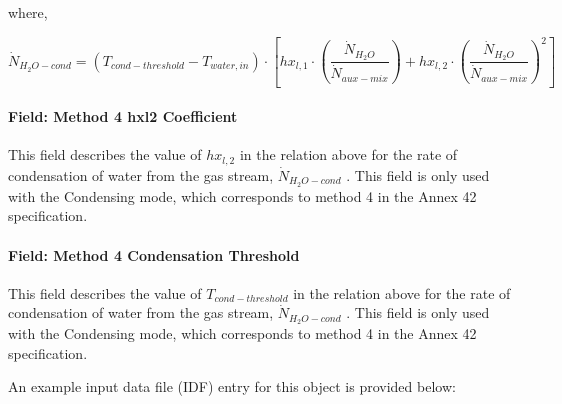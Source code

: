 where,

\begin{equation}
{\dot N_{{H_2}O - cond}} = \left( {{T_{cond - threshold}} - {T_{water,in}}} \right) \cdot \left[ {h{x_{l,1}} \cdot \left( {\frac{{{{\dot N}_{{H_2}O}}}}{{{{\dot N}_{aux - mix}}}}} \right) + h{x_{l,2}} \cdot {{\left( {\frac{{{{\dot N}_{{H_2}O}}}}{{{{\dot N}_{aux - mix}}}}} \right)}^2}} \right]
\end{equation}

\paragraph{Field: Method 4 hxl2 Coefficient}\label{field-method-4-hxl2-coefficient}

This field describes the value of \(h{x_{l,2}}\) in the relation above for the rate of condensation of water from the gas stream, \({\dot N_{{H_2}O - cond}}\) . This field is only used with the Condensing mode, which corresponds to method 4 in the Annex 42 specification.

\paragraph{Field: Method 4 Condensation Threshold}\label{field-method-4-condensation-threshold}

This field describes the value of \({T_{cond - threshold}}\) in the relation above for the rate of condensation of water from the gas stream, \({\dot N_{{H_2}O - cond}}\) . This field is only used with the Condensing mode, which corresponds to method 4 in the Annex 42 specification.

An example input data file (IDF) entry for this object is provided below:

